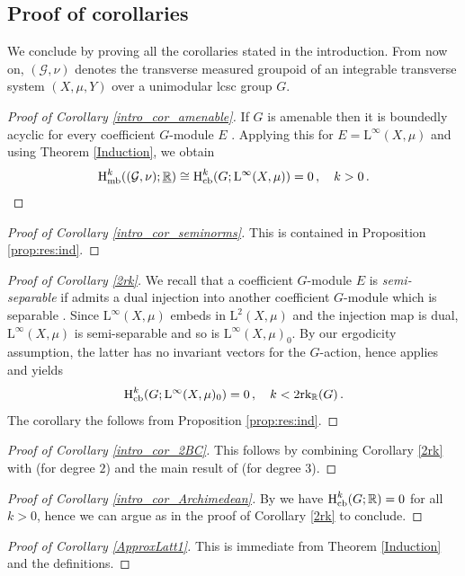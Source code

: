 \documentclass[11pt, oneside]{amsart}
\theoremstyle{definition}
\theoremstyle{remark}
\theoremstyle{TheoremNum}
\newcommand{\Hmb}{\textup{H}_{\textup{mb}}}
\newcommand{\Hcb}{\textup{H}_{\textup{cb}}}
\newcommand{\Linf}{\mathrm{L}^{\infty}}
\newcommand{\rk}{\text{rk}}
\newcommand{\cG}{\mathcal{G}}
\begin{document}
\subsection{Proof of corollaries} \label{sec:corollaries}
We conclude by proving all the corollaries stated in the introduction. From now on, $(\cG, \nu)$ denotes the transverse measured groupoid of an integrable transverse system $(X, \mu, Y)$ over a unimodular lcsc group $G$.
\begin{proof}[Proof of Corollary \ref{intro_cor_amenable}] If $G$ is amenable then it is boundedly acyclic for every coefficient $G$-module $E$ \cite[Corollary 7.5.11]{monod:libro}. Applying this for $E=\Linf(X,\mu)$ and using Theorem \ref{Induction}, we obtain
 \[\Hmb^k((\mathcal{G},\nu);\underline{\mathbb{R}})\cong\Hcb^k(G;\Linf(X,\mu))=0\,,\quad k>0\,.\qedhere\]
\end{proof}
\begin{proof}[Proof of Corollary \ref{intro_cor_seminorms}] This is contained in Proposition \ref{prop:res:ind}.
\end{proof}
\begin{proof}[Proof of Corollary \ref{2rk}] We recall that a coefficient $G$-module $E$ is \emph{semi-separable} if admits a dual injection into another coefficient $G$-module which is separable \cite{MonodSarithmetic}. Since $\Linf(X,\mu)$ embeds in $\textrm{L}^2(X,\mu)$ and the injection map is dual, $\Linf(X,\mu)$ is semi-separable and so is $\Linf(X,\mu)_0$. By our ergodicity assumption, the latter has no invariant vectors for the $G$-action, hence \cite[Theorem 1.2]{MonodSarithmetic} applies and yields 
\[\Hcb^k(G;\Linf(X,\mu)_0)=0\,,\quad k<2\rk_{\mathbb{R}}(G)\,.\]
The corollary the follows from Proposition \ref{prop:res:ind}.
\end{proof}
\begin{proof}[Proof of Corollary \ref{intro_cor_2BC}] 
This follows by combining Corollary \ref{2rk} with \cite{BuMo} (for degree $2$) and the main result of \cite{DLCM} (for degree $3$).
\end{proof}
\begin{proof}[Proof of Corollary \ref{intro_cor_Archimedean}]
 By \cite[Theorem A]{Flatmates} we have  $\Hcb^k(G;\mathbb{R})=0$ for all $k>0$, hence we can argue as in the proof of Corollary \ref{2rk} to conclude.
\end{proof}
\begin{proof}[Proof of Corollary \ref{ApproxLatt1}] This is immediate from Theorem \ref{Induction} and the definitions.
\end{proof}
\end{document}
